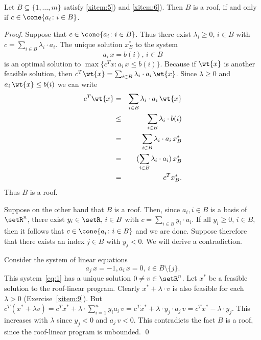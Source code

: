 \begin{lemma}
  \label{lem:4}  
  Let $B\subseteq\{1,\ldots,m\}$ satisfy \ref{xitem:5}) and
  \ref{xitem:6}). Then $B$ is a roof, if and only if $c \in \cone\{a_i\colon i \in B\}$. 
\end{lemma}

\begin{proof}
  Suppose that $c \in \cone\{a_i\colon i \in B\}$. Thus there exist
  $\lambda_i\geq0, \, i\in B$ with $c = \sum_{i \in B}\lambda_i\cdot a_i$. 
  The  unique solution $x^*_B$  to the
  system 
  \begin{equation}
    \label{eq:0}
    a_i\,x=b(i), \, i\in B
  \end{equation}
  is an optimal solution to
  $\max\{c^Tx \colon a_i\,x\leq b(i)\}$. Because if $\wt{x}$ is another feasible solution,
  then $c^T\wt{x} = \sum_{i\in B} \lambda_i \cdot a_i\, \wt{x}$. Since $\lambda \geq0$ and
  $a_i\,\wt{x}\leq b(i)$  we can write
  \begin{eqnarray}
    \label{eq:2}
    c^T\wt{x} & = &  \sum_{i\in B} \lambda_i\cdot a_i\,  \wt{x}\\
    & \leq & \sum_{i\in B} \lambda_i\cdot  b(i) \\
    & = &  \sum_{i\in B} \lambda_i\cdot  a_i\,x_B^*\\
    & = &  (\sum_{i\in B} \lambda_i\cdot  a_i )\, x_B^*\\
             & = & c^Tx_B^*.
  \end{eqnarray}
  Thus $B$ is a roof. 

  Suppose on the other hand that $B$ is a roof.  Then, since
  $a_i, i\in B$ is a basis of $\setR^n$, there exist $y_i \in  \setR, \, i \in B$ with 
  $c =  \sum_{i \in B}y_i \cdot a_i$. If all $y_i\geq0, \, i \in B$, then it
  follows that $c \in \cone\{a_i \colon i \in B\}$ and we are done. 
  Suppose therefore   that there exists an index  $j \in B$ with
  $y_{j}<0$. We will derive a contradiction. 

  Consider the system of linear equations
  \begin{equation}
    \label{eq:1}
    a_{j}\,x = -1, a_i\,x=0, \, i \in B\setminus\{j\}. 
  \end{equation}
  This system~\eqref{eq:1} has a unique solution $0\neq v\in \setR^n$.  
  Let $x^*$ be a feasible solution to the roof-linear
  program. Clearly $x^* + \lambda \cdot v$ is also feasible for each 
  $\lambda>0$ (Exercise~\ref{xitem:9}). But $c^T (x^* + \lambda v) = c^Tx^* + \lambda \cdot \sum_{i=1}^n y_i  a_i\,  v = c^T x^*
  + \lambda \cdot y_{j} \cdot  a_{j}\,v = c^T x^*  - \lambda \cdot y_{j} $. This increases with $\lambda$ since $y_{j}<0$ and
  $a_{j}\,v<0$.  This contradicts the fact $B$ is a roof, since the
  roof-linear program is unbounded. \qed 
\end{proof}





